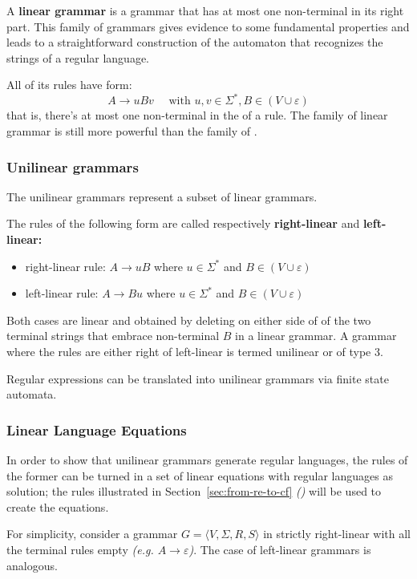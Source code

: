 \documentclass[english]{article}
\begin{document}
A \textbf{linear grammar} is a \CF grammar that has at most one non-terminal in its right part.
This family of grammars gives evidence to some fundamental properties and leads to a straightforward construction of the automaton that recognizes the strings of a regular language.

All of its rules have form:
\[A \rightarrow uBv \quad \text{ with } u, v \in \Sigma^\ast, B \in \left(V \cup \varepsilon\right) \]
that is, there's at most one non-terminal in the \RP of a rule.
The family of linear grammar is still more powerful than the family of \RE.

\subsubsection{Unilinear grammars}

The unilinear grammars represent a subset of linear grammars.

The rules of the following form are called respectively \textbf{right-linear} and \textbf{left-linear:}

\begin{itemize}
  \item right-linear rule: \(A \rightarrow uB \) where \(u \in \Sigma^\ast\) and \(B \in \left( V \cup \varepsilon \right)\)
  \item left-linear rule: \(A \rightarrow Bu \) where \(u \in \Sigma^\ast\) and \(B \in \left( V \cup \varepsilon \right)\)
\end{itemize}

Both cases are linear and obtained by deleting on either side of of the two terminal strings that embrace non-terminal \(B\) in a linear grammar.
A grammar where the rules are either right of left-linear is termed unilinear or of type 3.

Regular expressions can be translated into unilinear grammars via finite state automata.

\subsubsection{Linear Language Equations}

In order to show that unilinear grammars generate regular languages, the rules of the former can be turned in a set of linear equations with regular languages as solution;
the rules illustrated in Section~\ref{sec:from-re-to-cf} \textit{()} will be used to create the equations.

For simplicity, consider a grammar \(G = \langle V, \Sigma, R, S \rangle\) in strictly right-linear with all the terminal rules empty \textit{(e.g. \(A \rightarrow \varepsilon\))}.
The case of left-linear grammars is analogous.
\end{document}
